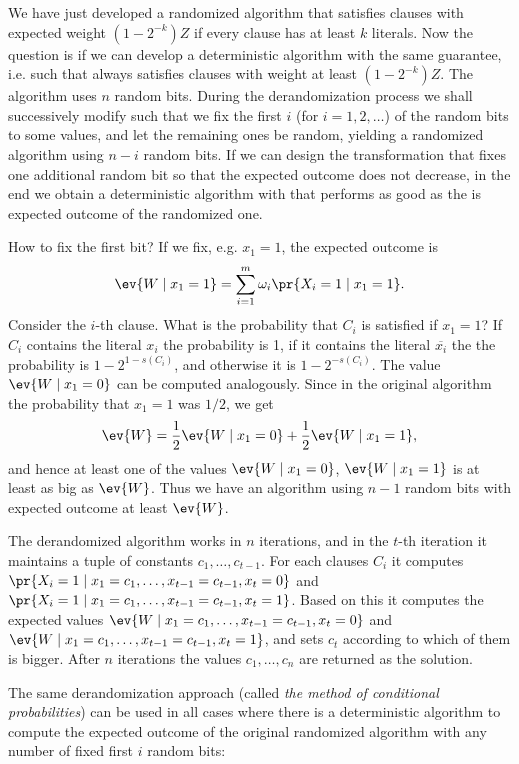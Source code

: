 \noindent
We have just developed a randomized algorithm that satisfies clauses with expected weight $(1-2^{-k})Z$
if every clause has at least $k$ literals. Now the question is if we can develop a deterministic algorithm 
with the same guarantee, i.e. such that always satisfies clauses with weight at least  $(1-2^{-k})Z$.
The algorithm  uses $n$ random bits. During the derandomization process we shall 
successively modify  such that we fix the first $i$ (for $i=1,2,\ldots$)
of the random bits to some values, and let the remaining ones be random, yielding a randomized algorithm
using $n-i$ random bits. If we can design the transformation that fixes one additional random bit so that
the expected outcome does not decrease, in the end we obtain a deterministic algorithm with that performs 
as good as the is expected outcome of the randomized one.

\noindent
How to fix the first bit? If we fix, e.g.
$x_1=1$, the expected outcome is
$$\ev{W\mid x_1=1}=\sum_{i=1}^m\omega_i\pr{X_i=1\mid x_1=1}.$$
Consider the $i$-th clause. What is the probability that $C_i$ is satisfied if $x_1=1$? If $C_i$
contains the literal $x_i$ the probability is 1, if it contains the literal  $\overline{x_i}$ the
the probability is $1-2^{1-s(C_i)}$, and otherwise it is $1-2^{-s(C_i)}$.
The value $\ev{W\mid x_1=0}$ can be computed analogously. Since in the original algorithm the 
probability that $x_1=1$ was $1/2$, we get 
$$\ev{W} = \frac{1}{2}\ev{W\mid x_1=0} + \frac{1}{2}\ev{W\mid x_1=1},$$
and hence at least one of the values  $\ev{W\mid x_1=0}$, $\ev{W\mid x_1=1}$ is at least as big
as $\ev{W}$. Thus we have an algorithm using $n-1$ random bits with expected outcome at least $\ev{W}$.

\noindent
The derandomized algorithm  works in $n$ iterations, and in the $t$-th iteration
it maintains a tuple of constants $c_1,\ldots,c_{t-1}$. For each clauses $C_i$ it computes 
$\pr{X_i=1\mid x_1=c_1,\ldots,x_{t-1}=c_{t-1},x_t=0}$  and $\pr{X_i=1\mid x_1=c_1,\ldots,x_{t-1}=c_{t-1},x_t=1}$.
Based on this it computes the expected values
$\ev{W\mid x_1=c_1,\ldots,x_{t-1}=c_{t-1},x_t=0}$ and
$\ev{W\mid x_1=c_1,\ldots,x_{t-1}=c_{t-1},x_t=1}$,
and sets $c_t$ according to which of them is bigger. After $n$ iterations the values $c_1,\ldots,c_n$
are returned as the solution.

\noindent
The same derandomization 
approach (called {\em the method of conditional probabilities}) can be used in all cases where
there is a deterministic algorithm to compute the expected outcome of the original randomized 
algorithm with any number of fixed first $i$ random bits:


